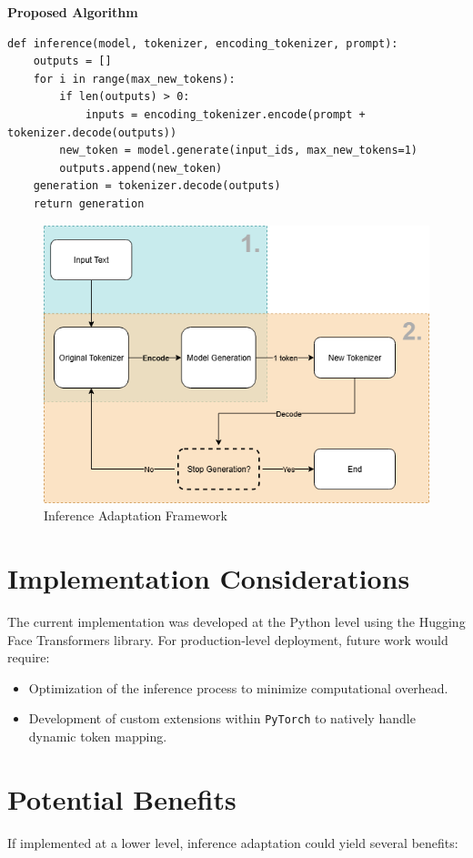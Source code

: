 \textbf{Proposed Algorithm}
\begin{lstlisting}
def inference(model, tokenizer, encoding_tokenizer, prompt):
    outputs = []
    for i in range(max_new_tokens):
        if len(outputs) > 0:
            inputs = encoding_tokenizer.encode(prompt + tokenizer.decode(outputs))
        new_token = model.generate(input_ids, max_new_tokens=1)
        outputs.append(new_token)
    generation = tokenizer.decode(outputs)
    return generation
\end{lstlisting}

\begin{figure}[h]
    \centering
    \includegraphics[width=0.8\linewidth]{Figures/Inference Adaptation.png}
    \caption{Inference Adaptation Framework}
    \label{fig:inference-adaptation}
\end{figure}

\section{Implementation Considerations}
The current implementation was developed at the Python level using the Hugging Face Transformers library. For production-level deployment, future work would require:

\begin{itemize}
    \item Optimization of the inference process to minimize computational overhead.
    \item Development of custom extensions within \texttt{PyTorch} to natively handle dynamic token mapping.
\end{itemize}

\section{Potential Benefits}
If implemented at a lower level, inference adaptation could yield several benefits:

